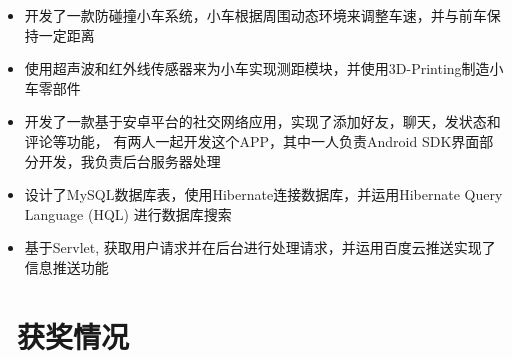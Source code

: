 \documentclass{resume}
\begin{document}
\begin{itemize}
  \item 开发了一款防碰撞小车系统，小车根据周围动态环境来调整车速，并与前车保持一定距离
  \item 使用超声波和红外线传感器来为小车实现测距模块，并使用3D-Printing制造小车零部件
\end{itemize}

\begin{itemize}
  \item 开发了一款基于安卓平台的社交网络应用，实现了添加好友，聊天，发状态和评论等功能，
有两人一起开发这个APP，其中一人负责Android SDK界面部分开发，我负责后台服务器处理
  \item 设计了MySQL数据库表，使用Hibernate连接数据库，并运用Hibernate Query Language (HQL)
进行数据库搜索
  \item 基于Servlet, 获取用户请求并在后台进行处理请求，并运用百度云推送实现了信息推送功能
\end{itemize}




\section{\faHeartO\ 获奖情况}


%
%
\end{document}
